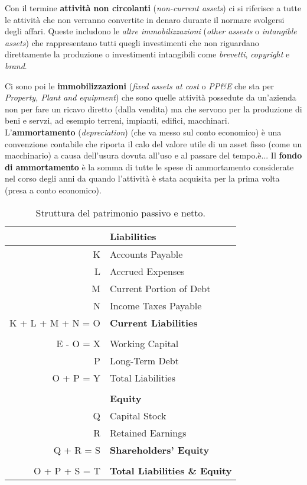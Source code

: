 \documentclass[a4paper,portrait,12pt]{article}
\theoremstyle{definition}
\begin{document}
Con il termine \textbf{attività non circolanti} (\emph{non-current assets}) ci si riferisce a tutte le attività che non verranno convertite in denaro durante il normare svolgersi degli affari.
Queste includono le \emph{altre immobilizzazioni} (\emph{other assests} o \emph{intangible assets}) che rappresentano tutti quegli investimenti che non riguardano direttamente la produzione o investimenti intangibili come \emph{brevetti}, \emph{copyright} e \emph{brand}.

Ci sono poi le \textbf{immobilizzazioni} (\emph{fixed assets at cost} o \emph{PP\&E} che sta per \emph{Property, Plant and equipment}) che sono quelle attività possedute da un'azienda non per fare un ricavo diretto (dalla vendita) ma che servono per la produzione di beni e servzi, ad esempio terreni, impianti, edifici, macchinari.\\

L'\textbf{ammortamento} (\emph{depreciation}) (che va messo sul conto economico) è una convenzione contabile che riporta il calo del valore utile di un asset fisso (come un macchinario) a causa dell'usura dovuta all'uso e al passare del tempo.è...
Il \textbf{fondo di ammortamento} è la somma di tutte le spese di ammortamento considerate nel corso degli anni da quando l'attività è stata acquisita per la prima volta (presa a conto economico).


\begin{table}[H]
\centering
\begin{tabular}{r|l}
 & \textbf{Liabilities}\\
\hline
K & Accounts Payable\\
L & Accrued Expenses\\
M & Current Portion of Debt\\
N & Income Taxes Payable\\
\hline
K + L + M + N = O & \textbf{Current Liabilities}\\
 & \\
E - O = X & Working Capital\\
P & Long-Term Debt\\
O + P = Y & Total Liabilities\\
 & \\
 & \textbf{Equity}\\
\hline
Q & Capital Stock\\
R & Retained Earnings\\
\hline
Q + R = S & \textbf{Shareholders' Equity}\\
 & \\
\hline
O + P + S = T & \textbf{Total Liabilities \& Equity}\\
\hline
\end{tabular}
\caption{Struttura del patrimonio passivo e netto.}
\end{table}
\end{document}

